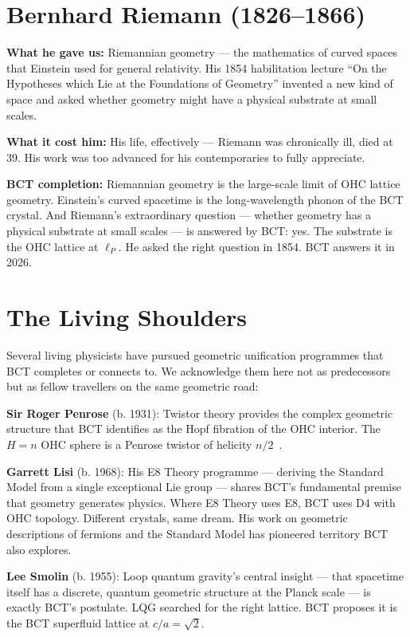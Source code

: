 \documentclass[twocolumn,10pt]{article}
\begin{document}
\section{Bernhard Riemann (1826--1866)}

\textbf{What he gave us:} Riemannian geometry --- the
mathematics of curved spaces that Einstein used for general
relativity. His 1854 habilitation lecture ``On the Hypotheses
which Lie at the Foundations of Geometry'' invented a new
kind of space and asked whether geometry might have a
physical substrate at small scales.

\textbf{What it cost him:} His life, effectively --- Riemann
was chronically ill, died at 39. His work was too advanced
for his contemporaries to fully appreciate.

\textbf{BCT completion:} Riemannian geometry is the
large-scale limit of OHC lattice geometry. Einstein's curved
spacetime is the long-wavelength phonon of the BCT crystal.
And Riemann's extraordinary question --- whether geometry has
a physical substrate at small scales --- is answered by BCT:
yes. The substrate is the OHC lattice at $\ell_P$.
He asked the right question in 1854. BCT answers it in 2026.

\section{The Living Shoulders}

Several living physicists have pursued geometric unification
programmes that BCT completes or connects to. We acknowledge
them here not as predecessors but as fellow travellers on the
same geometric road:

\textbf{Sir Roger Penrose} (b. 1931): Twistor theory provides
the complex geometric structure that BCT identifies as the
Hopf fibration of the OHC interior. The $H = n$ OHC sphere
is a Penrose twistor of helicity $n/2$~\cite{bct_jhapp}.

\textbf{Garrett Lisi} (b. 1968): His E8 Theory programme ---
deriving the Standard Model from a single exceptional Lie
group --- shares BCT's fundamental premise that geometry
generates physics. Where E8 Theory uses E8, BCT uses D4
with OHC topology. Different crystals, same dream.
His work on geometric descriptions of fermions and the
Standard Model has pioneered territory BCT also explores.

\textbf{Lee Smolin} (b. 1955): Loop quantum gravity's
central insight --- that spacetime itself has a discrete,
quantum geometric structure at the Planck scale --- is
exactly BCT's postulate. LQG searched for the right
lattice. BCT proposes it is the BCT superfluid lattice
at $c/a = \sqrt{2}$.
\end{document}
